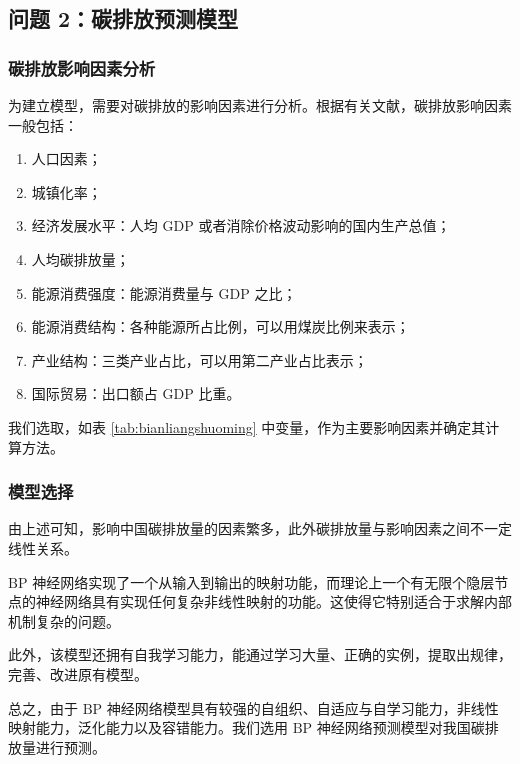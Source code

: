\subsection{问题 2：碳排放预测模型}

  \subsubsection{碳排放影响因素分析}
    为建立模型，需要对碳排放的影响因素进行分析。根据有关文献，碳排放影响因素一般包括\cite{NCEPU2019}：
    \begin{enumerate}
      \item 人口因素；
      \item 城镇化率；
      \item 经济发展水平：人均 $\mathrm{GDP}$ 或者消除价格波动影响的国内生产总值；
      \item 人均碳排放量；
      \item 能源消费强度：能源消费量与 $\mathrm{GDP}$ 之比；
      \item 能源消费结构：各种能源所占比例，可以用煤炭比例来表示；
      \item 产业结构：三类产业占比，可以用第二产业占比表示；
      \item 国际贸易：出口额占 $\mathrm{GDP}$ 比重。
    \end{enumerate}
    我们选取，如表 \ref{tab:bianliangshuoming} 中变量，作为主要影响因素并确定其计算方法。

  \subsubsection{模型选择}
    由上述可知，影响中国碳排放量的因素繁多，此外碳排放量与影响因素之间不一定线性关系。

    $\mathrm{BP}$ 神经网络实现了一个从输入到输出的映射功能，而理论上一个有无限个隐层节点的神经网络具有实现任何复杂非线性映射的功能。这使得它特别适合于求解内部机制复杂的问题\cite{liuzhongqi2010}。

    此外，该模型还拥有自我学习能力，能通过学习大量、正确的实例，提取出规律，完善、改进原有模型。

    总之，由于 $\mathrm{BP}$ 神经网络模型具有较强的自组织、自适应与自学习能力，非线性映射能力，泛化能力以及容错能力。我们选用 $\mathrm{BP}$ 神经网络预测模型对我国碳排放量进行预测。

